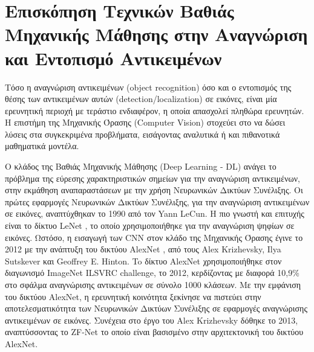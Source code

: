 \section{Επισκόπηση Τεχνικών Βαθιάς Μηχανικής Μάθησης στην Αναγνώριση και Εντοπισμό Αντικειμένων}
\label{sec:theory_sota}

Τόσο η αναγνώριση αντικειμένων (object recognition) όσο και ο εντοπισμός
της θέσης των αντικειμένων αυτών (detection/localization) σε εικόνες,
είναι μία ερευνητική περιοχή με τεράστιο ενδιαφέρον,
η οποία απασχολεί πληθώρα ερευνητών. Η επιστήμη της Μηχανικής Όρασης (Computer Vision) %
στοχεύει στο να δώσει λύσεις στα συγκεκριμένα προβλήματα, εισάγοντας αναλυτικά
ή και πιθανοτικά μαθηματικά μοντέλα.

Ο κλάδος της Βαθιάς Μηχανικής Μάθησης (Deep Learning - DL) \cite{Goodfellow-et-al-2016-Book}
ανάγει το πρόβλημα της εύρεσης χαρακτηριστικών σημείων για την αναγνώριση αντικειμένων,
στην εκμάθηση αναπαραστάσεων \cite{bengio2013representation}
με την χρήση Νευρωνικών Δικτύων Συνέλιξης. %
Οι πρώτες εφαρμογές Νευρωνικών Δικτύων Συνέλιξης, για την αναγνώριση αντικειμένων
σε εικόνες, αναπτύχθηκαν το 1990 από τον Yann LeCun.
Η πιο γνωστή και επιτυχής είναι το δίκτυο LeNet \cite{lecun1998gradient}, το οποίο
χρησιμοποιήθηκε για την αναγνώριση ψηφίων σε εικόνες.
Ωστόσο, η εισαγωγή των CNN στον κλάδο της Μηχανικής Όρασης έγινε το 2012 με
την ανάπτυξη του δικτύου AlexNet \cite{NIPS2012_4824}, από τους Alex Krizhevsky,
Ilya Sutskever και Geoffrey E. Hinton. To δίκτυο AlexNet χρησιμοποιήθηκε
στον διαγωνισμό ImageNet ILSVRC challenge, το 2012, κερδίζοντας με διαφορά
10,9\% στο σφάλμα αναγνώρισης αντικειμένων σε σύνολο 1000 κλάσεων.
Με την εμφάνιση του δικτύου AlexNet, η ερευνητική κοινότητα ξεκίνησε να
πιστεύει στην αποτελεσματικότητα των Νευρωνικών Δικτύων Συνέλιξης σε εφαρμογές αναγνώρισης
αντικειμένων σε εικόνες. Συνέχεια στο έργο του Alex Krizhevsky δόθηκε το 2013,
αναπτύσσοντας το ZF-Net \cite{DBLP:journals/corr/ZeilerF13} το οποίο είναι
βασισμένο στην αρχιτεκτονική του δικτύου AlexNet.


